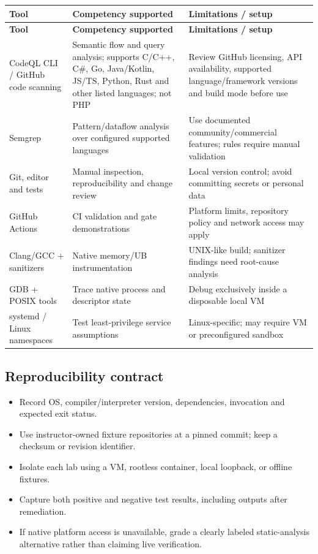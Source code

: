\documentclass[10pt,letterpaper]{article}
\begin{document}
\begingroup\footnotesize\setlength\tabcolsep{3pt}
\begin{longtable}{>{\raggedright\arraybackslash}p{}>{\raggedright\arraybackslash}p{}>{\raggedright\arraybackslash}p{}}\toprule
\textbf{Tool} & \textbf{Competency supported} & \textbf{Limitations / setup}\\\midrule\endfirsthead
\toprule \textbf{Tool} & \textbf{Competency supported} & \textbf{Limitations / setup}\\\midrule\endhead
CodeQL CLI / GitHub code scanning & Semantic flow and query analysis; supports C/C++, C\#, Go, Java/Kotlin, JS/TS, Python, Rust and other listed languages; not PHP & Review GitHub licensing, API availability, supported language/framework versions and build mode before use\\\midrule
Semgrep & Pattern/dataflow analysis over configured supported languages & Use documented community/commercial features; rules require manual validation\\\midrule
Git, editor and tests & Manual inspection, reproducibility and change review & Local version control; avoid committing secrets or personal data\\\midrule
GitHub Actions & CI validation and gate demonstrations & Platform limits, repository policy and network access may apply\\\midrule
Clang/GCC + sanitizers & Native memory/UB instrumentation & UNIX-like build; sanitizer findings need root-cause analysis\\\midrule
GDB + POSIX tools & Trace native process and descriptor state & Debug exclusively inside a disposable local VM\\\midrule
systemd / Linux namespaces & Test least-privilege service assumptions & Linux-specific; may require VM or preconfigured sandbox\\\midrule
\bottomrule\end{longtable}\endgroup
\subsection{Reproducibility contract}
\begin{itemize}[leftmargin=*,itemsep=2pt]
\item Record OS, compiler/interpreter version, dependencies, invocation and expected exit status.
\item Use instructor-owned fixture repositories at a pinned commit; keep a checksum or revision identifier.
\item Isolate each lab using a VM, rootless container, local loopback, or offline fixtures.
\item Capture both positive and negative test results, including outputs after remediation.
\item If native platform access is unavailable, grade a clearly labeled static-analysis alternative rather than claiming live verification.
\end{itemize}
\end{document}

